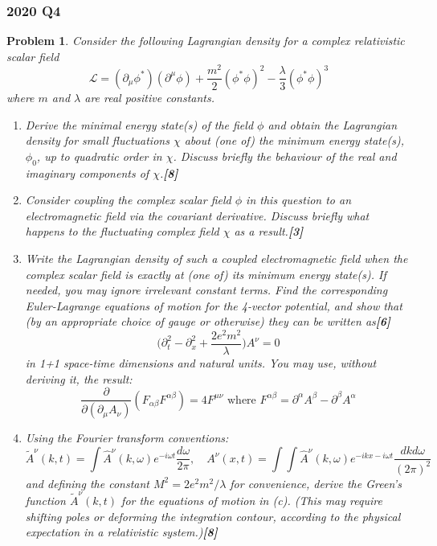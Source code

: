 \documentclass[a4paper]{article}
\theoremstyle{new}
\newtheorem{qns}{Problem}[section]
\begin{document}
\subsubsection*{2020 Q4}
\begin{qns}
Consider the following Lagrangian density for a complex relativistic scalar
field
$$\mathcal{L}=(\partial_\mu\phi^*)(\partial^\mu\phi)+\frac{m^2}{2}(\phi^*\phi)^2-\frac{\lambda}{3}(\phi^*\phi)^3$$
where $m$ and $\lambda$ are real positive constants.
\begin{enumerate}[label=(\alph*)]
\item Derive the minimal energy state(s) of the field $\phi$ and obtain the Lagrangian density for small fluctuations $\chi$ about (one of) the minimum energy state(s), $\phi_0$, up to quadratic order in $\chi$. Discuss briefly the behaviour of the real and imaginary components of $\chi$.\hfill\textbf{[8]}
\item Consider coupling the complex scalar field $\phi$ in this question to an electromagnetic field via the covariant derivative. Discuss briefly what happens to the fluctuating complex field $\chi$ as a result.\hfill\textbf{[3]}
\item Write the Lagrangian density of such a coupled electromagnetic field when the complex scalar field is exactly at (one of) its minimum energy state(s). If needed, you may ignore irrelevant constant terms. Find the corresponding Euler-Lagrange equations of motion for the 4-vector potential, and show that (by an appropriate choice of gauge or otherwise) they can be written as\hfill\textbf{[6]}
$$\bigg(\partial_t^2-\partial_x^2+\frac{2e^2m^2}{\lambda}\bigg)A^\nu=0$$
in 1+1 space-time dimensions and natural units. You may use, without deriving it, the result:
$$\frac{\partial}{\partial(\partial_\mu A_\nu)}(F_{\alpha\beta}F^{\alpha\beta})=4F^{\mu\nu}\text{ where } F^{\alpha\beta}=\partial^\alpha A^\beta -\partial^\beta A^\alpha$$
\item  Using the Fourier transform conventions:
$$\tilde{A}^\nu(k,t)=\int\hat{A}^\nu(k,\omega)e^{-i\omega t}\frac{d\omega}{2\pi},\quad A^\nu(x,t)=\int\int\hat{A}^\nu(k,\omega)e^{-ikx-i\omega t}\frac{dkd\omega}{(2\pi)^2}$$
and defining the constant $M^2=2e^2m^2/\lambda$ for convenience, derive the Green’s function $\tilde{A}^\nu(k,t)$ for the equations of motion in (c). (This may require shifting poles or deforming the integration contour, according to the physical expectation in a relativistic system.)\hfill\textbf{[8]}
\end{enumerate}
\end{qns}
\end{document}
